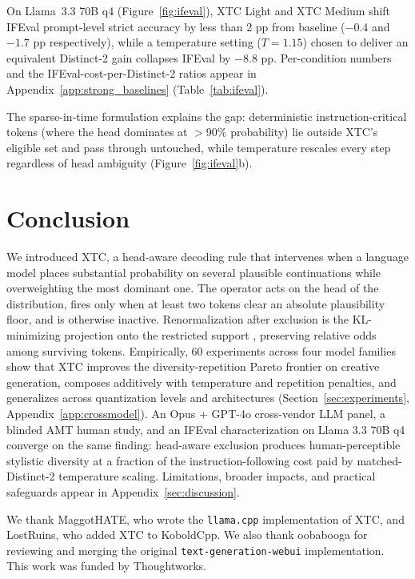 \documentclass{article}
\newcommand{\xtc}{\textsc{XTC}}
\begin{document}
On Llama~3.3 70B q4 (Figure~\ref{fig:ifeval}), \xtc{} Light and \xtc{} Medium shift IFEval prompt-level strict accuracy by less than 2 pp from baseline ($-0.4$ and $-1.7$ pp respectively), while a temperature setting ($T{=}1.15$) chosen to deliver an equivalent Distinct-2 gain collapses IFEval by $-8.8$ pp. Per-condition numbers and the IFEval-cost-per-Distinct-2 ratios appear in Appendix~\ref{app:strong_baselines} (Table~\ref{tab:ifeval}).

The sparse-in-time formulation explains the gap: deterministic instruction-critical tokens (where the head dominates at $>$90\% probability) lie outside \xtc{}'s eligible set and pass through untouched, while temperature rescales every step regardless of head ambiguity (Figure~\ref{fig:ifeval}b).

\section{Conclusion}

We introduced \xtc{}, a head-aware decoding rule that intervenes when a language model places substantial probability on several plausible continuations while overweighting the most dominant one.
The operator acts on the head of the distribution, fires only when at least two tokens clear an absolute plausibility floor, and is otherwise inactive.
Renormalization after exclusion is the KL-minimizing projection onto the restricted support \citep{csiszar1975divergence}, preserving relative odds among surviving tokens.
Empirically, 60 experiments across four model families show that \xtc{} improves the diversity-repetition Pareto frontier on creative generation, composes additively with temperature and repetition penalties, and generalizes across quantization levels and architectures (Section~\ref{sec:experiments}, Appendix~\ref{app:crossmodel}).
An Opus + GPT-4o cross-vendor LLM panel, a blinded AMT human study, and an IFEval characterization on Llama 3.3 70B q4 converge on the same finding: head-aware exclusion produces human-perceptible stylistic diversity at a fraction of the instruction-following cost paid by matched-Distinct-2 temperature scaling.
Limitations, broader impacts, and practical safeguards appear in Appendix~\ref{sec:discussion}.

\begin{ack}
We thank MaggotHATE, who wrote the \texttt{llama.cpp} implementation of \xtc{}, and LostRuins, who added \xtc{} to KoboldCpp. We also thank oobabooga for reviewing and merging the original \texttt{text-generation-webui} implementation.
This work was funded by Thoughtworks.
\end{ack}
\end{document}
